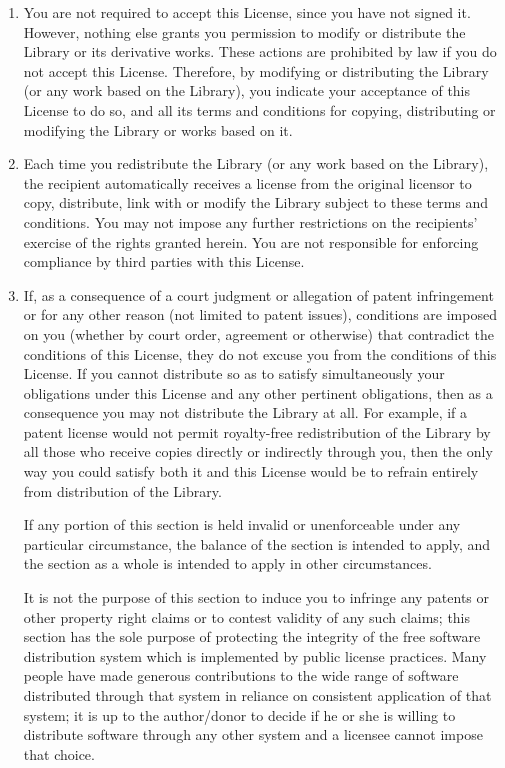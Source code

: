 {\begin{multicols}{2}
\begin{enumerate}
\item
You are not required to accept this License, since you have not signed it. 
However, nothing else grants you permission to modify or distribute the Library 
or its derivative works. These actions are prohibited by law if you do not 
accept this License. Therefore, by modifying or distributing the Library (or any 
work based on the Library), you indicate your acceptance of this License to do 
so, and all its terms and conditions for copying, distributing or modifying the 
Library or works based on it.

\item
Each time you redistribute the Library (or any work based on the Library), the 
recipient automatically receives a license from the original licensor to copy, 
distribute, link with or modify the Library subject to these terms and 
conditions. You may not impose any further restrictions on the recipients' 
exercise of the rights granted herein. You are not responsible for enforcing 
compliance by third parties with this License.

\item
If, as a consequence of a court judgment or allegation of patent infringement or 
for any other reason (not limited to patent issues), conditions are imposed on 
you (whether by court order, agreement or otherwise) that contradict the 
conditions of this License, they do not excuse you from the conditions of this 
License. If you cannot distribute so as to satisfy simultaneously your 
obligations under this License and any other pertinent obligations, then as a 
consequence you may not distribute the Library at all. For example, if a patent 
license would not permit royalty-free redistribution of the Library by all those 
who receive copies directly or indirectly through you, then the only way you 
could satisfy both it and this License would be to refrain entirely from 
distribution of the Library.

If any portion of this section is held invalid or unenforceable under any 
particular circumstance, the balance of the section is intended to apply, and 
the section as a whole is intended to apply in other circumstances.

It is not the purpose of this section to induce you to infringe any patents or 
other property right claims or to contest validity of any such claims; this 
section has the sole purpose of protecting the integrity of the free software 
distribution system which is implemented by public license practices. Many 
people have made generous contributions to the wide range of software 
distributed through that system in reliance on consistent application of that 
system; it is up to the author/donor to decide if he or she is willing to 
distribute software through any other system and a licensee cannot impose that 
choice.


\end{enumerate}
\end{multicols}}
